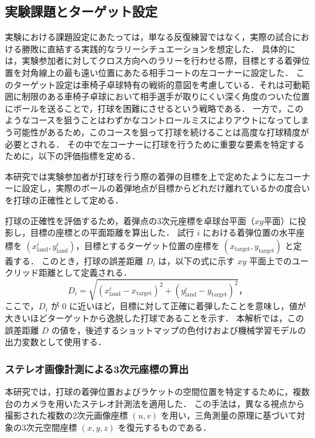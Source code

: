 \documentclass[../main]{subfiles}
\begin{document}
\subsection{実験課題とターゲット設定}
\label{subsec:bounce}

実験における課題設定にあたっては，単なる反復練習ではなく，実際の試合における勝敗に直結する実践的なラリーシチュエーションを想定した．
具体的には，実験参加者に対してクロス方向へのラリーを行わせる際，目標とする着弾位置を対角線上の最も遠い位置にあたる相手コートの左コーナーに設定した．
このターゲット設定は車椅子卓球特有の戦術的意図を考慮している．それは可動範囲に制限のある車椅子卓球において相手選手が取りにくい深く角度のついた位置にボールを送ることで，打球を困難にさせるという戦略である．
一方で，このようなコースを狙うことはわずかなコントロールミスによりアウトになってしまう可能性があるため，このコースを狙って打球を続けることは高度な打球精度が必要とされる．
その中で左コーナーに打球を行うために重要な要素を特定するために，以下の評価指標を定める．

本研究では実験参加者が打球を行う際の着弾の目標を上で定めたように左コーナーに設定し，実際のボールの着弾地点が目標からどれだけ離れているかの度合いを打球の正確性として定める．

打球の正確性を評価するため，着弾点の3次元座標を卓球台平面（$xy$平面）に投影し，目標の座標との平面距離を算出した．
試行 $i$ における着弾位置の水平座標を $(x_{\mathrm{land}}^{i}, y_{\mathrm{land}}^{i})$，目標とするターゲット位置の座標を $(x_{\mathrm{target}}, y_{\mathrm{target}})$ と定義する．
このとき，打球の誤差距離 $D_i$ は，以下の式に示す $xy$ 平面上でのユークリッド距離として定義される．
\begin{equation}
D_i = \sqrt{(x_{\mathrm{land}}^{i} - x_{\mathrm{target}})^2 + (y_{\mathrm{land}}^{i} - y_{\mathrm{target}})^2}  ，
\end{equation}
ここで，$D_i$ が $0$ に近いほど，目標に対して正確に着弾したことを意味し，値が大きいほどターゲットから逸脱した打球であることを示す．
本解析では，この誤差距離 $D$ の値を，後述するショットマップの色付けおよび機械学習モデルの出力変数として使用する．


\subsubsection{ステレオ画像計測による3次元座標の算出}
\label{subsubsec:stereo_measurement}

本研究では，打球の着弾位置およびラケットの空間位置を特定するために，複数台のカメラを用いたステレオ計測法を適用した．
この手法は，異なる視点から撮影された複数の2次元画像座標 $(u, v)$ を用い，三角測量の原理に基づいて対象の3次元空間座標 $(x, y, z)$ を復元するものである．
\end{document}
